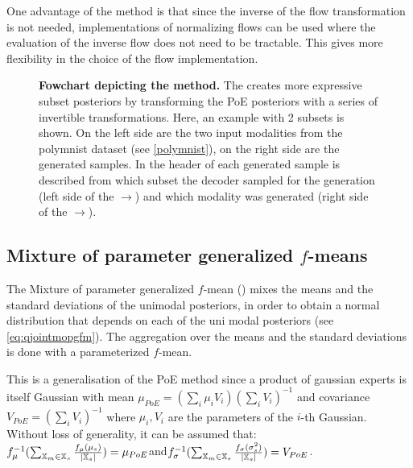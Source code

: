 One advantage of the  method is that since the inverse of the flow transformation is not needed, implementations of normalizing flows can be used where the evaluation of the inverse flow does not need to be tractable.
This gives more flexibility in the choice of the flow implementation.

\begin{figure}[h!]
    \centering
    \caption{\textbf{Fowchart depicting the  method.} The  creates more expressive subset posteriors by transforming the PoE posteriors with a series of invertible transformations.
    Here, an example with 2 subsets is shown. On the left side are the two input modalities from the polymnist dataset (see \cref{polymnist}), on the right side are the generated samples.
    In the header of each generated sample is described from which subset the decoder sampled for the generation (left side of the $\rightarrow$) and which modality was generated (right side of the $\rightarrow$).}
    \label{fig:mofopoe}
\end{figure}


\subsection{Mixture of parameter generalized $f$-means}\label{subsec:mopgfm}
The Mixture of parameter generalized $f$-mean () mixes the means and the standard deviations of the unimodal posteriors, in order to obtain a normal distribution that depends on each of the uni modal posteriors (see \cref{eq:qjointmopgfm}).
The aggregation over the means and the standard deviations is done with a parameterized $f$-mean.

\smallskip

This is a generalisation of the PoE method since a product of gaussian experts is itself Gaussian with mean $\mu_{PoE} = (\sum _i \mu _i V_i)(\sum _i V_i)^{-1}$ and covariance $V_{PoE}= (\sum _i V_i)^{-1}$ where $\mu _i, V_i$ are the parameters of the $i$-th Gaussian.\\
Without loss of generality, it can be assumed that:\\
$f_{\mu}^{-1}(\sum _{\mathbb{X}_m \in \mathbb{X}_s} \frac{f_{\mu}(\mu_s)}{|\mathbb{X}_s|}) = \mu_{PoE}$\quad and\quad $f_{\sigma}^{-1}(\sum  _{\mathbb{X}_m \in \mathbb{X}_s} \frac{f_{\sigma}(\sigma_s^2)}{|\mathbb{X}_s|}) = V_{PoE}$.

